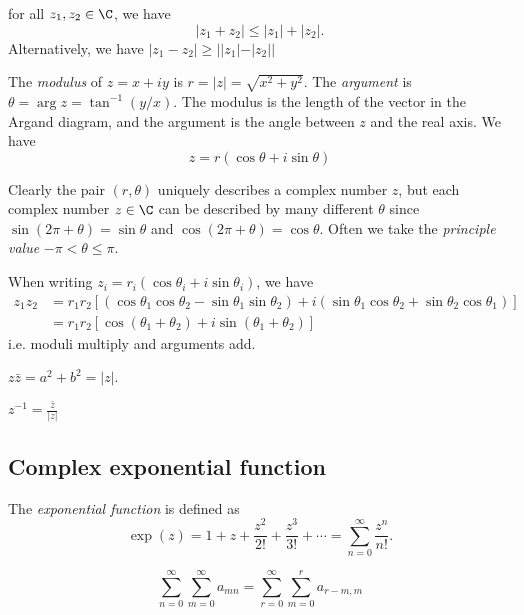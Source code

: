 \documentclass[a4paper]{article}
\begin{document}
\begin{thm}
  for all $z_1, z_2 \in \C$, we have
  \[
  |z_1 + z_2| \leq |z_1| + |z_2|.
  \]
  Alternatively, we have $|z_1 - z_2|\geq ||z_1| - |z_2||$
\end{thm}

\begin{defi}
  The \emph{modulus} of $z = x + iy$ is $r = |z| = \sqrt{x^2 + y^2}$. The \emph{argument} is $\theta = \arg z = \tan^{-1} (y/x)$. The modulus is the length of the vector in the Argand diagram, and the argument is the angle between $z$ and the real axis. We have
  \[
  z = r(\cos\theta + i\sin \theta)
  \]

  Clearly the pair $(r, \theta)$ uniquely describes a complex number $z$, but each complex number $z\in \C$ can be described by many different $\theta$ since $\sin (2\pi + \theta) = \sin \theta$ and $\cos(2\pi + \theta) = \cos\theta$. Often we take the \emph{principle value} $-\pi < \theta \leq \pi$.
\end{defi}

When writing $z_i = r_i(\cos\theta_i + i\sin \theta_i)$, we have
\begin{align*}
  z_1z_2 &= r_1r_2[(\cos\theta_1\cos\theta_2 - \sin\theta_1\sin\theta_2) + i(\sin\theta_1\cos\theta_2 + \sin\theta_2\cos\theta_1)]\\
  &= r_1r_2[\cos(\theta_1 + \theta_2) + i\sin(\theta_1+\theta_2)]
\end{align*}
i.e. moduli multiply and arguments add.

\begin{prop}
  $z\bar{z} = a^2 + b^2 = |z|$.
\end{prop}
\begin{prop}
  $z^{-1} = \frac{\bar{z}}{|z|}$
\end{prop}

\subsection{Complex exponential function}
\begin{defi}
  The \emph{exponential function} is defined as
  \[
  \exp (z) = 1 + z + \frac{z^2}{2!} + \frac{z^3}{3!} + \cdots = \sum_{n = 0}^\infty \frac{z^n}{n!}.
  \]
\end{defi}

\begin{lemma}
  \[
  \sum_{n = 0}^\infty\sum_{m = 0}^\infty a_{mn} = \sum_{r = 0}^\infty\sum_{m = 0}^r a_{r - m, m}
  \]
\end{lemma}
\end{document}
